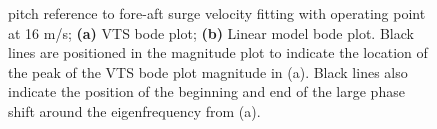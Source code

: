 \begin{figure}[ht]
	\centering
	
	\hfil
	
	\caption{pitch reference to fore-aft surge velocity fitting with operating point at 16 m/s; \textbf{(a)} VTS bode plot; \textbf{(b)} Linear model bode plot. Black lines are positioned in the magnitude plot to indicate the location of the peak of the VTS bode plot magnitude in (a). Black lines also indicate the position of the beginning and end of the large phase shift around the eigenfrequency from (a).}
	\label{fig:app_wref-vy_16}
\end{figure}



%	
%	
